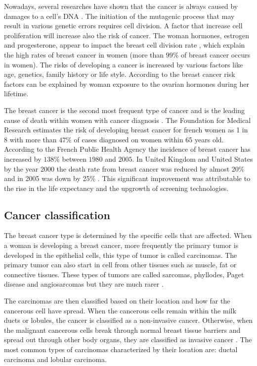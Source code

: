 Nowadays, several researches \citep{pike_estrogens_1993,martin_webmd_2017} have shown that the cancer is always caused by damages to a cell's DNA . The initiation of the mutagenic process that may result in various genetic errors requires cell division.  A factor that increase cell proliferation will increase also the risk of cancer. The woman hormones, estrogen and progesterone, appear to impact the breast cell division rate \citep{ciocca_estrogen_1997,fanelli_estrogen_1996},  which explain the high rates of breast cancer in women (more than $99\%$ of breast cancer occurs in women). The risks of developing a cancer is increased by various factors like age, genetics, family history or life style. According to \citep{martin_webmd_2017} the breast cancer risk factors can be explained by woman exposure to the ovarian hormones during her lifetime.

The breast cancer is the second most frequent type of cancer and is the leading cause of death within women with cancer diagnosis \citep{spf_chiffres_2017}.  The Foundation for Medical Research \citep{frm_chiffres_2017} estimates the risk of developing breast cancer for french women as 1 in 8 with more than $47\%$ of cases diagnosed on women within 65 years old.
According to the French Public Health Agency \cite{spf_chiffres_2017} the incidence of breast cancer has increased by $138\% $ between $1980$ and $2005$. In United Kingdom and United States by the year 2000 the death rate from breast cancer was reduced by almost 20\% and in 2005 was down by 25\% \citep{peto_uk_2000}. This significant improvement was attributable to the rise in the life expectancy and the upgrowth of screening technologies.


\subsection{Cancer classification }\label{subsection:breastcancerclasification}
The breast cancer type is determined by the specific cells that are affected. 
When a woman is developing a breast cancer, more frequently the primary tumor is developed in the epithelial cells, this type of tumor is called carcinomas. The primary tumor can also start in cell from other tissues such as muscle, fat or connective tissues. These types of tumors are called sarcomas, phyllodes, Paget disease and angiosarcomas but they are much rarer \cite{acs_cancer_2017}. 

The carcinomas are then classified based on their location and how far the cancerous cell have spread. When the cancerous cells remain within the milk ducts or lobules, the cancer is classified as a non-invasive cancer. Otherwise, when the malignant cancerous cells break through normal breast tissue barriers and spread out through other body organs, they are classified as invasive cancer \citep{andolina2011mammographic}. The most common types of carcinomas characterized by their location are: ductal carcinoma and lobular carcinoma. 

